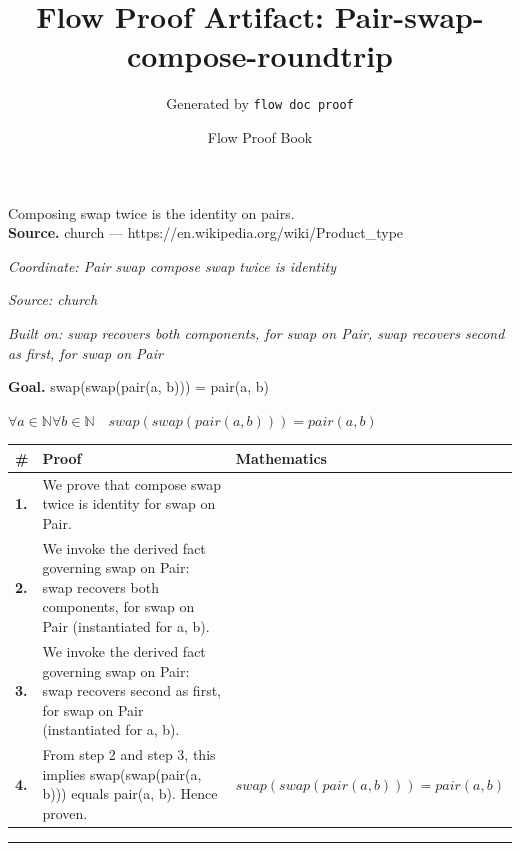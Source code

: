 \documentclass[11pt]{article}
\title{Flow Proof Artifact: Pair-swap-compose-roundtrip}
\author{Generated by \texttt{flow doc proof}}
\date{Flow Proof Book}
\theoremstyle{definition}
\begin{document}
\maketitle
Composing swap twice is the identity on pairs.\\[0.5em]
\textbf{Source.} church — https://en.wikipedia.org/wiki/Product\_type\\[0.5em]
\bigskip
{}\par
\smallskip\noindent\textit{Coordinate: Pair \cdot swap \cdot compose swap twice is identity}\par
\smallskip\noindent\textit{Source: church}\par
\smallskip\noindent\textit{Built on: swap recovers both components, for swap on Pair, swap recovers second as first, for swap on Pair}\par
\medskip
\noindent\textbf{Goal.} swap(swap(pair(a, b))) = pair(a, b)\par
\noindent$\displaystyle \forall a \in \mathbb{N} \forall b \in \mathbb{N}\quad swap(swap(pair(a, b))) = pair(a, b)$\par
\medskip
\noindent
\begin{tabular}{@{} >{\raggedright\arraybackslash}p{} >{\raggedright\arraybackslash}p{} >{\raggedleft\arraybackslash}p{} @{}}
\textbf{\#} & \textbf{Proof} & \textbf{Mathematics} \\
\midrule
\textbf{1.} & We prove that compose swap twice is identity for swap on Pair. & \\[0.45em]
\textbf{2.} & We invoke the derived fact governing swap on Pair: swap recovers both components, for swap on Pair (instantiated for a, b). & \\[0.45em]
\textbf{3.} & We invoke the derived fact governing swap on Pair: swap recovers second as first, for swap on Pair (instantiated for a, b). & \\[0.45em]
\textbf{4.} & From step 2 and step 3, this implies swap(swap(pair(a, b))) equals pair(a, b). Hence proven. & $\displaystyle swap(swap(pair(a, b))) = pair(a, b)$ \\[0.45em]
\bottomrule
\end{tabular}
\label{thm:Pair-swap-compose_swap_twice_is_identity}
\par\medskip\hrule
\end{document}

